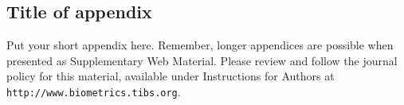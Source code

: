 \documentclass[useAMS,referee]{biom}
\begin{document}
\appendix


\section{}
\subsection{Title of appendix}

Put your short appendix here.  Remember, longer appendices are
possible when presented as Supplementary Web Material.  Please 
review and follow the journal policy for this material, available
under Instructions for Authors at \texttt{http://www.biometrics.tibs.org}.

\label{lastpage}
\end{document}
